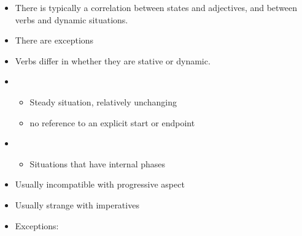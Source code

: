 \documentclass[headrule,footrule]{foils}
\begin{document}

\begin{itemize}
\item  There is typically  a correlation between states and 
adjectives, and between verbs and dynamic 
situations.
\begin{exe}
\ex {}
\ex {}
\ex {}
\ex {}
\end{exe}
\item There are exceptions
\begin{exe}
\ex {}
\ex {}
\ex {}
\ex {}
\ex {}
\end{exe}



\item  Verbs differ in whether they are stative or dynamic.
\begin{exe}
\ex {}
\ex {}
\end{exe}
\item  {}
  \begin{itemize}
  \item  Steady situation, relatively unchanging
  \item  no reference to an explicit start or endpoint
  \end{itemize}
\item  {}
  \begin{itemize}
  \item   Situations that have internal phases    
  \end{itemize}
\end{itemize}


\begin{itemize}
\item    Usually incompatible with progressive aspect
  \begin{exe}
    \ex {}
    \ex {}
  \end{exe}
\item  Usually strange with imperatives
  \begin{exe}
    \ex {}
    \ex {}
  \end{exe}
\item  Exceptions: 
\end{itemize}
\end{document}
